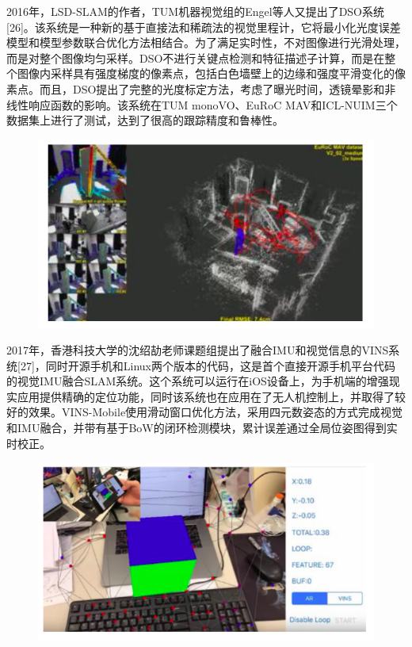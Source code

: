 2016年，LSD-SLAM的作者，TUM机器视觉组的Engel等人又提出了DSO系统[26]。该系统是一种新的基于直接法和稀疏法的视觉里程计，它将最小化光度误差模型和模型参数联合优化方法相结合。为了满足实时性，不对图像进行光滑处理，而是对整个图像均匀采样。DSO不进行关键点检测和特征描述子计算，而是在整个图像内采样具有强度梯度的像素点，包括白色墙壁上的边缘和强度平滑变化的像素点。而且，DSO提出了完整的光度标定方法，考虑了曝光时间，透镜晕影和非线性响应函数的影响。该系统在TUM monoVO、EuRoC MAV和ICL-NUIM三个数据集上进行了测试，达到了很高的跟踪精度和鲁棒性。
\begin{figure}[H]%
	\centering  %
	\includegraphics[width=0.7\linewidth]{image/Talk/14.png}  %

\end{figure}


2017年，香港科技大学的沈绍劼老师课题组提出了融合IMU和视觉信息的VINS系统[27]，同时开源手机和Linux两个版本的代码，这是首个直接开源手机平台代码的视觉IMU融合SLAM系统。这个系统可以运行在iOS设备上，为手机端的增强现实应用提供精确的定位功能，同时该系统也在应用在了无人机控制上，并取得了较好的效果。VINS-Mobile使用滑动窗口优化方法，采用四元数姿态的方式完成视觉和IMU融合，并带有基于BoW的闭环检测模块，累计误差通过全局位姿图得到实时校正。
\begin{figure}[H]%
	\centering  %
	\includegraphics[width=0.7\linewidth]{image/Talk/15.png}  %

\end{figure}

